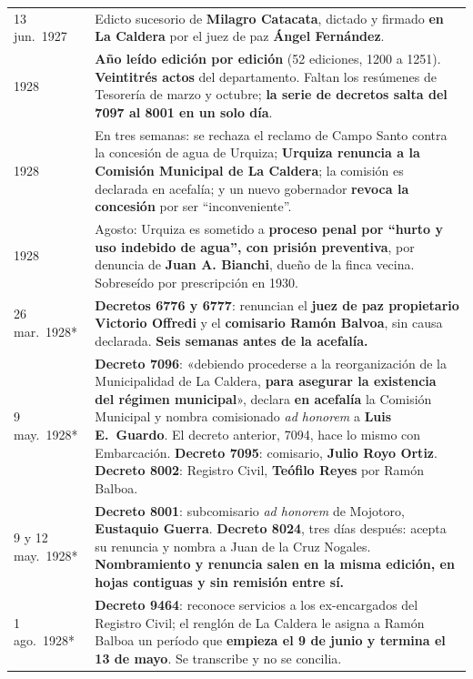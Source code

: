 \begin{longtable}{@{}p{2.7cm}p{10.3cm}@{}}
13 jun.\ 1927 & Edicto sucesorio de \textbf{Milagro Catacata}, dictado y firmado \textbf{en La Caldera} por el juez de paz \textbf{Ángel Fernández}. \\
1928 & \textbf{Año leído edición por edición} (52 ediciones, 1200 a 1251). \textbf{Veintitrés actos} del departamento. Faltan los resúmenes de Tesorería de marzo y octubre; \textbf{la serie de decretos salta del 7097 al 8001 en un solo día}. \\
1928 & En tres semanas: se rechaza el reclamo de Campo Santo contra la concesión de agua de Urquiza\index{Urquiza, Francisco S.}; \textbf{Urquiza renuncia a la Comisión Municipal de La Caldera}; la comisión es declarada en acefalía; y un nuevo gobernador \textbf{revoca la concesión} por ser ``inconveniente''. \\
1928 & Agosto: Urquiza\index{Urquiza, Francisco S.} es sometido a \textbf{proceso penal por ``hurto y uso indebido de agua'', con prisión preventiva}, por denuncia de \textbf{Juan A. Bianchi\index{Bianchi, Juan A.}}, dueño de la finca vecina. Sobreseído por prescripción en 1930. \\
26 mar.\ 1928* & \textbf{Decretos 6776 y 6777}: renuncian el \textbf{juez de paz propietario Victorio Offredi} y el \textbf{comisario Ramón Balvoa}, sin causa declarada. \textbf{Seis semanas antes de la acefalía.} \\
9 may.\ 1928* & \textbf{Decreto 7096}: «debiendo procederse a la reorganización de la Municipalidad de La Caldera, \textbf{para asegurar la existencia del régimen municipal}», declara \textbf{en acefalía} la Comisión Municipal y nombra comisionado \textit{ad honorem} a \textbf{Luis E.\ Guardo}. El decreto anterior, 7094, hace lo mismo con Embarcación. \textbf{Decreto 7095}: comisario, \textbf{Julio Royo Ortiz}. \textbf{Decreto 8002}: Registro Civil, \textbf{Teófilo Reyes} por Ramón Balboa. \\
9 y 12 may.\ 1928* & \textbf{Decreto 8001}: subcomisario \textit{ad honorem} de Mojotoro, \textbf{Eustaquio Guerra}. \textbf{Decreto 8024}, tres días después: acepta su renuncia y nombra a Juan de la Cruz Nogales. \textbf{Nombramiento y renuncia salen en la misma edición, en hojas contiguas y sin remisión entre sí.} \\
1 ago.\ 1928* & \textbf{Decreto 9464}: reconoce servicios a los ex-encargados del Registro Civil; el renglón de La Caldera le asigna a Ramón Balboa un período que \textbf{empieza el 9 de junio y termina el 13 de mayo}. Se transcribe y no se concilia. \\

\end{longtable}
